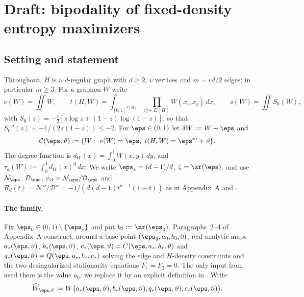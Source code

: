 
\section{Draft: bipodality of fixed-density entropy maximizers}
\label{kb:sec}

\subsection{Setting and statement}

Throughout, $H$ is a $d$-regular graph with $d\ge2$, $v$ vertices and
$m=vd/2$ edges; in particular $m\ge3$.  For a graphon $W$ write
\[
  e(W)=\iint W,\qquad
  t(H,W)=\int_{[0,1]^{V(H)}}\prod_{ij\in E(H)}W(x_i,x_j)\,dx,\qquad
  s(W)=\iint S_0(W),
\]
with $S_0(z)=-\tfrac12[z\log z+(1-z)\log(1-z)]$, so that
$S_0''(z)=-1/(2z(1-z))\le-2$.  For $\eps\in(0,1)$ let $\delta W:=W-\eps$ and
\[
  \mathcal C(\eps,\vartheta)
  :=\{W:\ e(W)=\eps,\ t(H,W)=\eps^m+\vartheta\}.
\]
The degree function is $d_W(x)=\int_0^1W(x,y)\,dy$, and
$\tau_d(W):=\int_0^1d_W(x)^d\,dx$.  We write $\eps_*=(d-1)/d$,
$\zeta=\zr(\eps)$, and use $\mathcal N_\eps$, $\mathcal D_\eps$,
$\psi_d=\mathcal N_\eps/\mathcal D_\eps$ and
$R_d(t)=\mathcal N''/\mathcal D''=-1/(d(d-1)t^{d-1}(1-t))$ as in
Appendix~A and .

\paragraph{The family.}
Fix $\eps_0\in(0,1)\setminus\{\eps_*\}$ and put $b_0:=\zr(\eps_0)$.
Paragraphs~2--4 of Appendix~A construct, around a base point
$(\eps_0,a_0,b_0,0)$, real-analytic maps $a_*(\eps,\vartheta)$,
$b_*(\eps,\vartheta)$, $c_*(\eps,\vartheta)=C(\eps,a_*,b_*,\vartheta)$ and
$q_*(\eps,\vartheta)=Q(\eps,a_*,b_*,c_*)$ solving the edge and
$H$-density constraints and the two desingularized stationarity equations
$F_1=F_2=0$.  The only input from \cite[Theorem~1.1]{kenyon2014entropy}
used there is the value $a_0$; we replace it by an explicit definition
in .  Write
\[
  \widehat W_{\eps,\vartheta}
  :=W\bigl(a_*(\eps,\vartheta),b_*(\eps,\vartheta),
           q_*(\eps,\vartheta),c_*(\eps,\vartheta)\bigr).
\]

